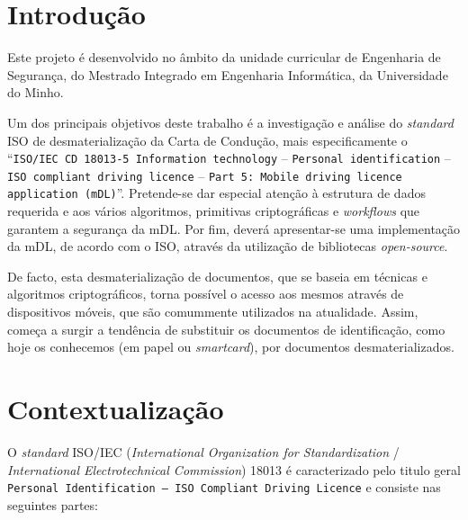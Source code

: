 \documentclass[11pt]{article}
\begin{document}
\tableofcontents

\newpage



\section{Introdução}

Este projeto é desenvolvido no âmbito da unidade curricular de Engenharia de Segurança, do Mestrado Integrado em Engenharia Informática, da Universidade do Minho.

Um dos principais objetivos deste trabalho é a investigação e análise do \textit{standard} ISO de desmaterialização da Carta de Condução, mais especificamente o ``\texttt{ISO/IEC CD 18013-5 Information technology} -- \texttt{Personal identification} -- \texttt{ISO compliant driving licence} -- \texttt{Part 5: Mobile driving licence application (mDL)}''. Pretende-se dar especial atenção à estrutura de dados requerida e aos vários algoritmos, primitivas criptográficas e \textit{workflows} que garantem a segurança da mDL. Por fim, deverá apresentar-se uma implementação da mDL, de acordo com o ISO, através da utilização de bibliotecas \textit{open-source}.

De facto, esta desmaterialização de documentos, que se baseia em técnicas e algoritmos criptográficos, torna possível o acesso aos mesmos através de dispositivos móveis, que são comummente utilizados na atualidade. Assim, começa a surgir a tendência de substituir os documentos de identificação, como hoje os conhecemos (em papel ou \textit{smartcard}), por documentos desmaterializados.


\section{Contextualização}

O \textit{standard} ISO/IEC (\textit{International Organization for Standardization} / \textit{International Electrotechnical Commission}) 18013 é caracterizado pelo titulo geral \texttt{Personal Identification — ISO
Compliant Driving Licence} e consiste nas seguintes partes:
\end{document}
